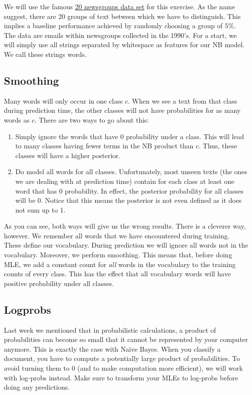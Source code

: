 \documentclass[11pt, leqno, a4paper]{article}
\begin{document}
We will use the famous \href{http://qwone.com/~jason/20Newsgroups/}{20 newsgroups data set} for this 
exercise. As the name suggest, there are 20 groups of text between which we have to distinguish. This
implies a baseline performance achieved by randomly choosing a group of $ 5\% $. The data are emails
within newsgroups collected in the 1990's. For a start, we will simply use all strings separated by
whitespace as features for our NB model. We call these strings words.

\subsection{Smoothing}

Many words will only occur in one class $ c $. When we see a text from that class during prediction time, the
other classes will not have probabilities for as many words as $ c $. There are two ways to go about this:
\begin{enumerate}
\item Simply ignore the words that have 0 probability under a class. This will lead to many classes
having fewer terms in the NB product than $ c $. Thus, these classes will have a higher posterior.
\item Do model all words for all classes. Unfortunately, most unseen texts (the ones we are dealing
with at prediction time) contain for each class at least one word that has 0 probability. In effect, the
posterior probability for all classes will be 0. Notice that this means the posterior is not even defined
as it does not sum up to 1.
\end{enumerate} 

As you can see, both ways will give us the wrong results. There is a cleverer way, however. We remember
all words that we have encountered during training. These define our vocabulary. During prediction we
will ignore all words not in the vocabulary. Moreover, we perform smoothing. This means that, before
doing MLE, we add a constant count for \textit{all} words in the vocabulary to the training counts
of every class. This has the effect that all vocabulary words will have positive probability under
all classes. 

\subsection{Logprobs}

Last week we mentioned that in probabilistic calculations, a product of probabilities can become so
small that it cannot be represented by your computer anymore. This is exactly the case with Na\"ive
Bayes. When you classify a document, you have to compute a potentially large product of probabilities.
To avoid turning them to 0 (and to make computation more efficient), we will work with log-probs
instead. Make sure to transform your MLEs to log-probs before doing any predictions.
\end{document}

